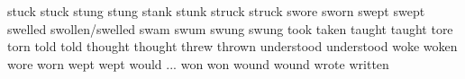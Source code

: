 	            {stuck}{}	            {stuck}{}               {}{}
	            {stung}{}	            {stung}{}               {}{}
	            {stank}{}	            {stunk}{}               {}{}
	            {struck}{}	            {struck}{}              {}{}
	            {swore}{}	            {sworn}{}               {}{}
	            {swept}{}	            {swept}{}               {}{}
	            {swelled}{}	            {swollen/swelled}{}     {}{}
	            {swam}{}	            {swum}{}                {}{}
	            {swung}{}	            {swung}{}               {}{}
	            {took}{}	            {taken}{}               {}{}
	            {taught}{}	            {taught}{}              {}{}
	            {tore}{}	            {torn}{}                {}{}
	            {told}{}	            {told}{}                {}{}
	            {thought}{}	            {thought}{}             {}{}
	            {threw}{}	            {thrown}{}              {}{}
	        {understood}{}	        {understood}{}          {}{}
	            {woke}{}	            {woken}{}               {}{}
	            {wore}{}	            {worn}{}                {}{}
	            {wept}{}	            {wept}{}                {}{}
	            {would}{}	            {...}{}                 {}{}
	            {won}{}	                {won}{}                 {}{}
	            {wound}{}	            {wound}{}               {}{}
	            {wrote}{}	            {written}{}             {}{}